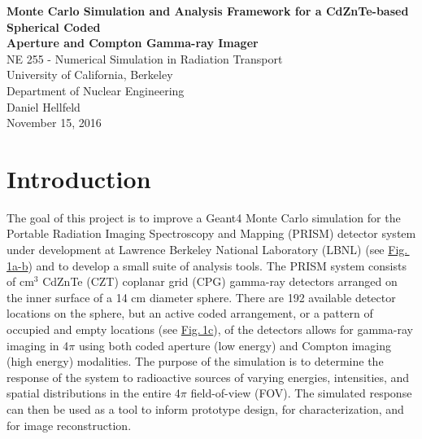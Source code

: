 \documentclass[10pt]{article}
\begin{document}
\begin{centering}
\textbf{Monte Carlo Simulation and Analysis Framework for a CdZnTe-based Spherical Coded\\[-5pt] Aperture and Compton Gamma-ray Imager}\\
\vspace{5pt}
NE 255 - Numerical Simulation in Radiation Transport \\[-5pt]
University of California, Berkeley \\[-5pt]
Department of Nuclear Engineering\\
\vspace{5pt}
Daniel Hellfeld\\
\vspace{5pt}
November 15, 2016 \\
\end{centering}


\section{Introduction}

The goal of this project is to improve a Geant4 \cite{Agostinelli2003} Monte Carlo simulation for the Portable Radiation Imaging Spectroscopy and Mapping (PRISM) detector system under development at Lawrence Berkeley National Laboratory (LBNL) (see \hyperlink{fig1}{Fig.\,1a-b}) and to develop a small suite of analysis tools. The PRISM system consists of cm$^3$ CdZnTe (CZT) coplanar grid (CPG) gamma-ray detectors arranged on the inner surface of a 14 cm diameter sphere. There are 192 available detector locations on the sphere, but an active coded arrangement, or a pattern of occupied and empty locations (see \hyperlink{fig1}{Fig.\,1c}), of the detectors allows for gamma-ray imaging in 4$\pi$ using both coded aperture (low energy) and Compton imaging (high energy) modalities. The purpose of the simulation is to determine the response of the system to radioactive sources of varying energies, intensities, and spatial distributions in the entire 4$\pi$ field-of-view (FOV). The simulated response can then be used as a tool to inform prototype design, for characterization, and for image reconstruction. 
\end{document}
